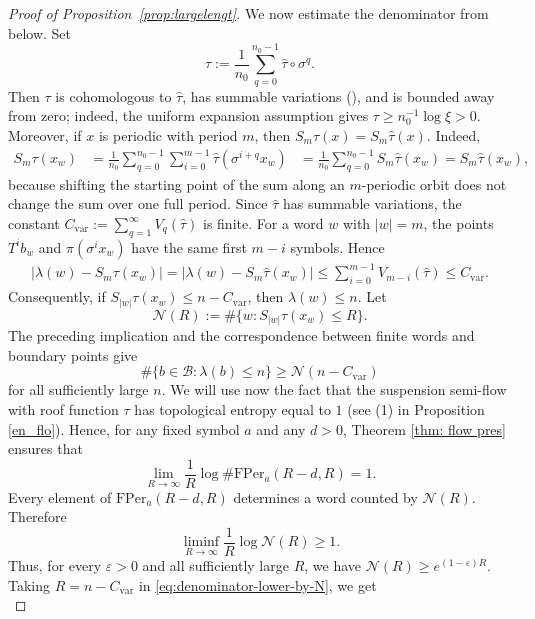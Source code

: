 \documentclass[letterpaper,11pt]{amsart}
\numberwithin{equation}{section}     %
\def\le{\leqslant}
\def\ge{\geqslant}
\begin{document}
\begin{proof}[Proof of Proposition~\ref{prop:largelengt}]
We now estimate the denominator from below. Set
\begin{equation} \label{sym-tau}
\tau:=\frac1{n_0}\sum_{q=0}^{n_0-1}\widehat\tau\circ\sigma^q .
\end{equation}
Then $\tau$ is cohomologous to $\widehat\tau$, has summable variations (\cite[Proposition~3.1.3]{j}), and is
bounded away from zero; indeed, the uniform expansion assumption gives
$\tau\ge n_0^{-1}\log\xi>0$. Moreover, if $x$ is periodic with period $m$,
then $S_m\tau(x)=S_m\widehat\tau(x).$ Indeed,
\[
\begin{aligned}
S_m\tau(x_w)
&=
\frac1{n_0}\sum_{q=0}^{n_0-1}
\sum_{i=0}^{m-1}
\widehat\tau(\sigma^{i+q}x_w)  
&=
\frac1{n_0}\sum_{q=0}^{n_0-1}
S_m\widehat\tau(x_w)
=
S_m\widehat\tau(x_w),
\end{aligned}
\]
because shifting the starting point of the sum along an $m$-periodic orbit
does not change the sum over one full period. Since $\widehat\tau$ has summable variations, the constant
$C_{\mathrm{var}}:=\sum_{q=1}^{\infty}V_q(\widehat\tau)$
is finite. For a word $w$ with $|w|=m$, the points $T^i b_w$ and
$\pi(\sigma^i x_w)$ have the same first $m-i$ symbols. Hence
\[
\begin{aligned}
\left|\lambda(w)-S_m\tau(x_w)\right|
=
\left|\lambda(w)-S_m\widehat\tau(x_w)\right| 
\le \sum_{i=0}^{m-1} V_{m-i}(\widehat\tau) 
\le C_{\mathrm{var}} .
\end{aligned}
\]
Consequently, if $S_{|w|}\tau(x_w)\le n-C_{\mathrm{var}}$, then
$\lambda(w)\le n$. Let
\[
\mathcal N(R):=
\#\{w:S_{|w|}\tau(x_w)\le R\}.
\]
The preceding implication and the correspondence between finite words and boundary points give
\begin{equation}\label{eq:denominator-lower-by-N}
\#\{b\in\mathcal B:\lambda(b)\le n\}
\ge \mathcal N(n-C_{\mathrm{var}})
\end{equation}
for all sufficiently large $n$. We will use now the fact that the suspension semi-flow with roof function $\tau$ has topological entropy equal to $1$ (see (1) in Proposition \ref{en_flo}). Hence, for any fixed symbol $a$ and any $d>0$, Theorem \ref{thm: flow pres} ensures that
\[
\lim_{R\to\infty}
\frac1R\log \#\mathrm{FPer}_a(R-d,R)=1.
\]
Every element of $\mathrm{FPer}_a(R-d,R)$ determines a word counted by
$\mathcal N(R)$. Therefore
\[
\liminf_{R\to\infty}\frac1R\log\mathcal N(R)\ge 1.
\]
Thus, for every $\varepsilon>0$ and all sufficiently large $R$, we have $\mathcal N(R)\ge e^{(1-\varepsilon)R}.$
Taking $R=n-C_{\mathrm{var}}$ in \eqref{eq:denominator-lower-by-N}, we get
\begin{equation}\label{eq:denominator-lower}

\end{equation}
\end{proof}
\end{document}
